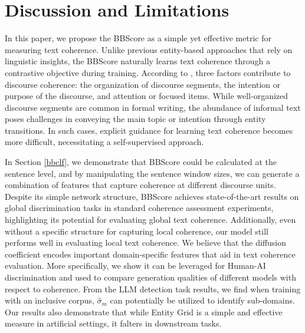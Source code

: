 \documentclass[letterpaper]{article}
\begin{document}
\section{Discussion and Limitations}
In this paper, we propose the BBScore as a simple yet effective metric for measuring text coherence. Unlike previous entity-based approaches that rely on linguistic insights, the BBScore naturally learns text coherence through a contrastive objective during training. According to \cite{grosz-sidner-1986-attention}, three factors contribute to discourse coherence: the organization of discourse segments, the intention or purpose of the discourse, and attention or focused items. While well-organized discourse segments are common in formal writing, the abundance of informal text poses challenges in conveying the main topic or intention through entity transitions. In such cases, explicit guidance for learning text coherence becomes more difficult, necessitating a self-supervised approach.

In Section \ref{bbclf}, we demonstrate that BBScore could be calculated at the sentence level, and by manipulating the sentence window sizes, we can generate a combination of features that capture coherence at different discourse units. Despite its simple network structure, BBScore achieves state-of-the-art results on global discrimination tasks in standard coherence assessment experiments, highlighting its potential for evaluating global text coherence. Additionally, even without a specific structure for capturing local coherence, our model still performs well in evaluating local text coherence. We believe that the diffusion coefficient encodes important domain-specific features that aid in text coherence evaluation. More specifically, we show it can be leveraged for Human-AI discrimination and used to compare generation qualities of different models with respect to coherence. From the LLM detection task results, we find when training with an inclusive corpus, $\hat\sigma_m$ can potentially be utilized to identify sub-domains. %
Our results also demonstrate that while Entity Grid is a simple and effective measure in artificial settings, it falters in downstream tasks.
\end{document}
